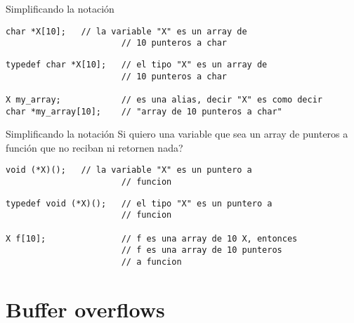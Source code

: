 \begin{frame}[fragile]{Simplificando la notaci\'on}{}
         \begin{lstlisting}[style=normal]
        char *X[10];   // la variable "X" es un array de
                       // 10 punteros a char

         \end{lstlisting}
         \begin{lstlisting}[style=normal]
typedef char *X[10];   // el tipo "X" es un array de
                       // 10 punteros a char

X my_array;            // es una alias, decir "X" es como decir
char *my_array[10];    // "array de 10 punteros a char"

         \end{lstlisting}
\end{frame}
\begin{frame}[fragile]{Simplificando la notaci\'on}{}
Si quiero una variable que sea un array de punteros a funci\'on que no reciban ni retornen nada?
         \begin{lstlisting}[style=normal]
        void (*X)();   // la variable "X" es un puntero a
                       // funcion

         \end{lstlisting}
         \begin{lstlisting}[style=normal]
typedef void (*X)();   // el tipo "X" es un puntero a
                       // funcion

X f[10];               // f es una array de 10 X, entonces
                       // f es una array de 10 punteros
                       // a funcion
         \end{lstlisting}
\end{frame}

\section{Buffer overflows}
